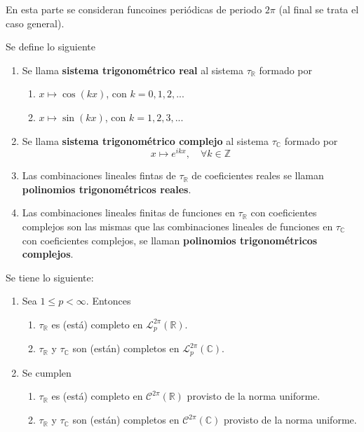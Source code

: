 \documentclass[12pt]{report}
\theoremstyle{largebreak}
\begin{document}
    En esta parte se consideran funcoines periódicas de periodo $2\pi$ (al final se trata el caso general).

    \begin{mydef}
        Se define lo siguiente
        \begin{enumerate}
            \item Se llama \textbf{sistema trigonométrico real} al sistema $\tau_{\mathbb{R}}$ formado por
            \begin{enumerate}
                \item $x\mapsto\cos(kx)$, con $k=0,1,2,...$
                \item $x\mapsto\sin(kx)$, con $k=1,2,3,...$
            \end{enumerate}
            \item Se llama \textbf{sistema trigonométrico complejo} al sistema $\tau_{\mathbb{C}}$ formado por
            \begin{equation*}
                x\mapsto e^{ikx},\quad \forall k\in\mathbb{Z}
            \end{equation*}
            \item Las combinaciones lineales fintas de $\tau_{\mathbb{R}}$ de coeficientes reales se llaman \textbf{polinomios trigonométricos reales}.
            \item Las combinaciones lineales finitas de funciones en $\tau_{\mathbb{R}}$ con coeficientes complejos son las mismas que las combinaciones lineales de funciones en $\tau_{\mathbb{C}}$ con coeficientes complejos, se llaman \textbf{polinomios trigonométricos complejos}.
        \end{enumerate}
    \end{mydef}

    \begin{theor}
        Se tiene lo siguiente:
        \begin{enumerate}
            \item Sea $1\leq p<\infty$. Entonces
            \begin{enumerate}
                \item $\tau_{\mathbb{R}}$ es (está) completo en $\mathcal{L}_p^{2\pi}(\mathbb{R})$.
                \item $\tau_{\mathbb{R}}$ y $\tau_{\mathbb{C}}$ son (están) completos en $\mathcal{L}_p^{2\pi}(\mathbb{C})$.
            \end{enumerate}
            \item Se cumplen
            \begin{enumerate}
                \item $\tau_{\mathbb{R}}$ es (está) completo en $\mathcal{C}^{2\pi}(\mathbb{R})$ provisto de la norma uniforme.
                \item $\tau_{\mathbb{R}}$ y $\tau_{\mathbb{C}}$ son (están) completos en $\mathcal{C}^{2\pi}(\mathbb{C})$ provisto de la norma uniforme.
            \end{enumerate}
        \end{enumerate}
    \end{theor}
\end{document}
